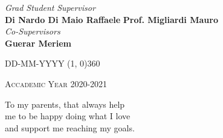 \documentclass[a4paper, 12pt, twoside, openright]{book}
\newenvironment{abstract}{\cleardoublepage \null \vfill \begin{center}\bfseries\abstractname \end{center}}{\vfill\null}
\begin{document}
\begin{titlepage}
\vfill
\begin{normalsize}
\begin{flushleft}
  \hspace{55pt} \textit{Grad Student} \hspace{120pt} \textit{Supervisor}\\
  \vspace{5pt}
  \hspace{25pt} \large{\textbf{\footnotesize{Di Nardo Di Maio Raffaele}}} \hspace{55pt} \large{\textbf{\footnotesize{Prof. Migliardi Mauro}}}\\
  \vspace{50pt}
  \hspace{240pt} \normalsize{\textit{Co-Supervisors}}\\
  \vspace{5pt}
  \hspace{242pt} \large{\textbf{\footnotesize{Guerar Meriem}}}
\end{flushleft}
\end{normalsize}

\vfill
\begin{center}
\textsc{DD-MM-YYYY}
\hspace{-0.2cm}
\line(1, 0){360}

\textsc{Accademic Year 2020-2021}
\end{center}
\end{titlepage}


\cleardoublepage %
\thispagestyle{empty} %

\null
\vspace{2cm}
\begin{flushright}
  To my parents, that always help\\
 me to be happy doing what I love\\
and support me reaching my goals.
\end{flushright}
\vfill
\begin{quote}
  \textit{}
\end{quote}
\vfill
\null


%
\begingroup %
  \makeatletter
  \let\ps@plain\ps@empty
  \makeatother
  \tableofcontents  
  \clearpage
\endgroup

\mainmatter



\end{document}
